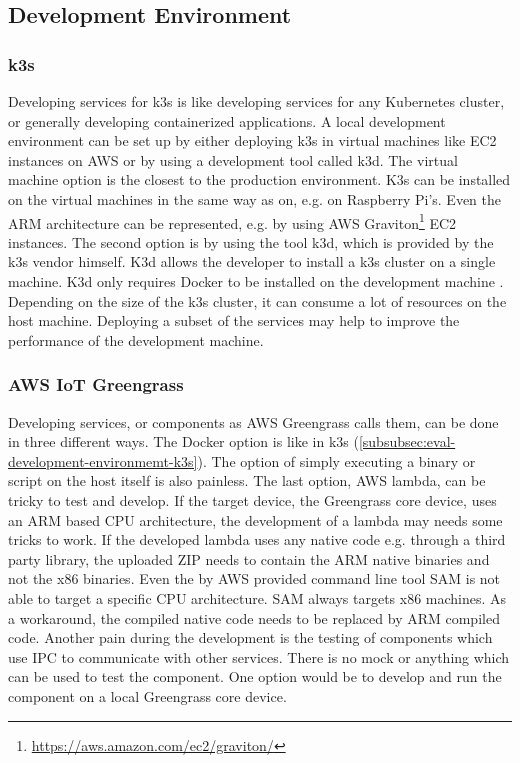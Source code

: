\subsection*{Development Environment}
\subsubsection*{k3s}\label{subsubsec:eval-development-environmemt-k3s}
Developing services for k3s is like developing services for any Kubernetes cluster, or generally developing containerized applications. A local development environment can be set up by either deploying k3s in virtual machines like EC2 instances on \gls{AWS} or by using a development tool called k3d. The virtual machine option is the closest to the production environment. K3s can be installed on the virtual machines in the same way as on, e.g. on Raspberry Pi's. Even the ARM architecture can be represented, e.g. by using AWS Graviton\footnote{\url{https://aws.amazon.com/ec2/graviton/}} EC2 instances. The second option is by using the tool k3d, which is provided by the k3s vendor himself. K3d allows the developer to install a k3s cluster on a single machine. K3d only requires Docker to be installed on the development machine \cite{RancherDocsAdvancedOptions}. Depending on the size of the k3s cluster, it can consume a lot of resources on the host machine. Deploying a subset of the services may help to improve the performance of the development machine.
    
\subsubsection*{AWS IoT Greengrass}
Developing services, or components as AWS Greengrass calls them, can be done in three different ways. The Docker option is like in k3s  (\ref{subsubsec:eval-development-environmemt-k3s}). The option of simply executing a binary or script on the host itself is also painless. The last option, AWS lambda, can be tricky to test and develop. If the target device, the Greengrass core device, uses an ARM based CPU architecture, the development of a lambda may needs some tricks to work. If the developed lambda uses any native code e.g. through a third party library, the uploaded ZIP needs to contain the ARM native binaries and not the x86 binaries. Even the by \gls{AWS} provided command line tool \gls{SAM} is not able to target a specific CPU architecture. \gls{SAM} always targets x86 machines. As a workaround, the compiled native code needs to be replaced by ARM compiled code. Another pain during the development is the testing of components which use \gls{IPC} to communicate with other services. There is no mock or anything which can be used to test the component. One option would be to develop and run the component on a local Greengrass core device.

